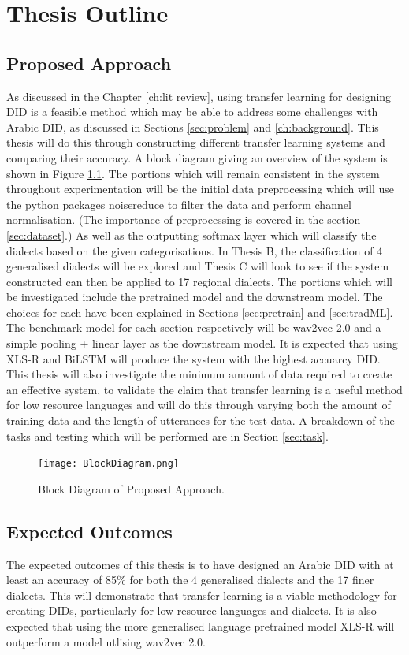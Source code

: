
\chapter{Thesis Outline}\label{ch:outline}
\section{Proposed Approach}
As discussed in the Chapter \ref{ch:lit review}, using transfer learning for designing DID is a feasible method which 
may be able to address some challenges with Arabic DID, as discussed in Sections \ref{sec:problem} and \ref{ch:background}. 
This thesis will do this through constructing different transfer learning systems and comparing their accuracy. A block diagram 
giving an overview of the system is shown in Figure \ref{fig:Block}. The portions which 
will remain consistent in the system throughout experimentation will be the initial data preprocessing which will use the python packages noisereduce 
to filter the data and perform channel normalisation. (The importance of preprocessing is covered in the section \ref{sec:dataset}.) As well as the outputting softmax layer which will classify the dialects based on the 
given categorisations. In Thesis B, the classification of 4 generalised dialects will be explored and Thesis C will look to see if the system constructed 
can then be applied to 17 regional dialects. The portions which will be investigated include the pretrained model and the downstream model. The choices for 
each have been explained in Sections \ref{sec:pretrain} and \ref{sec:tradML}. The benchmark model for each section respectively will be wav2vec 2.0 and a simple 
pooling + linear layer as the downstream model. It is expected that using XLS-R and BiLSTM will produce the system with the highest accuarcy DID. This thesis 
will also investigate the minimum amount of data required to create an effective system, to validate the claim that transfer learning is a useful method for low resource 
languages and will do this through varying both the amount of training data and the length of utterances for the test data. A breakdown of the tasks and testing which 
will be performed are in Section \ref{sec:task}. 

\begin{figure}[h!]
    \centering
    \texttt{[image: BlockDiagram.png]}
    \caption{Block Diagram of Proposed Approach.}
    \label{fig:Block}
\end{figure}

\section{Expected Outcomes}
The expected outcomes of this thesis is to have designed an Arabic DID with at 
least an accuracy of 85\% for both the 4 generalised dialects and the 17 finer dialects. 
This will demonstrate that transfer learning is a viable methodology for 
creating DIDs, particularly for low resource languages and dialects.
It is also expected that using the more generalised language pretrained model XLS-R 
will outperform a model utlising wav2vec 2.0. 

